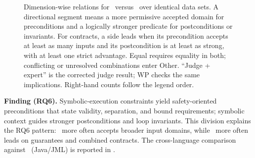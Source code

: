 \begin{figure}[t]
\caption{{Dimension-wise relations for \autospec\ versus \toolname\ over identical data sets. A directional segment means a more permissive accepted domain for preconditions and a logically stronger predicate for postconditions or invariants. For contracts, a side leads when its precondition accepts at least as many inputs and its postcondition is at least as strong, with at least one strict advantage. Equal requires equality in both; conflicting or unresolved combinations enter Other. ``Judge + expert'' is the corrected judge result; WP checks the same implications. Right-hand counts follow the legend order.}}
\label{fig:fc_vs_judge_strength}
\end{figure}
\let\strengthbar\relax

\begin{finding}
{\textbf{Finding (RQ6).} Symbolic-execution constraints yield safety-oriented preconditions that state validity, separation, and bound requirements; symbolic context guides stronger postconditions and loop invariants. This division explains the RQ6 pattern: \autospec\ more often accepts broader input domains, while \toolname\ more often leads on guarantees and combined contracts. The cross-language comparison against \specgen\ (Java/JML) is reported in .}
\end{finding}

